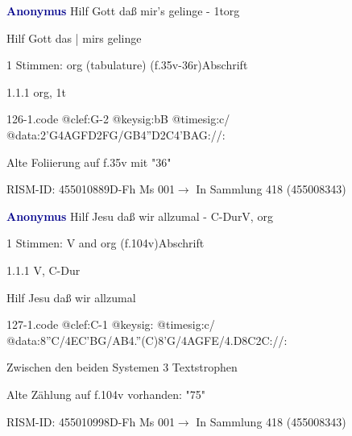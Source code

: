 \documentclass[twocolumn, 12pt]{book}
\begin{document}
\par \vspace{16pt} \textcolor{darkblue}{\textbf{Anonymus  }}\hfillplus{\textbf{[126]}}\newline Hilf Gott daß mir's gelinge - 1t\newline org
\par \begin{itshape}[f.35v, at left:] Hilf Gott das | mirs gelinge\end{itshape} 
\par \textcolor{darkblue}{}  1 Stimmen: org (tabulature)  (f.35v-36r)\newline Abschrift
\par 1.1.1  org, 1t  
\begin{filecontents*}{126-1.code}
@clef:G-2
@keysig:bB
@timesig:c/
@data:2'G4AGFD2FG/GB4''D2C4'BAG://:
\end{filecontents*}
\newline %
\par Alte Foliierung auf f.35v mit "36"
\par RISM-ID: 455010889\newline D-Fh  Ms 001\newline $\rightarrow$ In Sammlung 418 (455008343)
      
\par \vspace{16pt} \textcolor{darkblue}{\textbf{Anonymus  }}\hfillplus{\textbf{[127]}}\newline Hilf Jesu daß wir allzumal - C-Dur\newline V, org
\par \begin{itshape}\end{itshape} 
\par \textcolor{darkblue}{}  1 Stimmen: V and org  (f.104v)\newline Abschrift
\par 1.1.1  V, C-Dur\newline \begin{footnotesize} Hilf Jesu daß wir allzumal \end{footnotesize}  
\begin{filecontents*}{127-1.code}
@clef:C-1
@keysig:
@timesig:c/
@data:8''C/4EC'BG/AB4.''(C)8'G/4AGFE/4.D8C2C://:
\end{filecontents*}
\newline %
\par Zwischen den beiden Systemen 3 Textstrophen
\par Alte Zählung auf f.104v vorhanden: "75"
\par RISM-ID: 455010998\newline D-Fh  Ms 001\newline $\rightarrow$ In Sammlung 418 (455008343)
      
\end{document}
